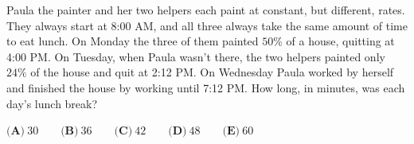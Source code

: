 Paula the painter and her two helpers each paint at constant, but different, rates. They always start at 8:00 AM, and all three always take the same amount of time to eat lunch. On Monday the three of them painted $50\%$ of a house, quitting at 4:00 PM. On Tuesday, when Paula wasn't there, the two helpers painted only $24\%$ of the house and quit at 2:12 PM. On Wednesday Paula worked by herself and finished the house by working until 7:12 PM. How long, in minutes, was each day's lunch break?

$\textbf{(A)}\ 30\qquad\textbf{(B)}\ 36\qquad\textbf{(C)}\ 42\qquad\textbf{(D)}\ 48\qquad\textbf{(E)}\ 60$
